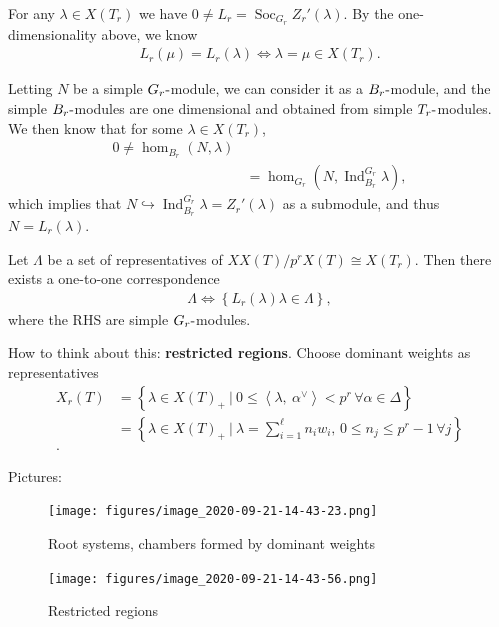 For any \(\lambda \in X(T_r)\) we have
\(0\neq L_r = \operatorname{Soc}_{G_r} Z_r'(\lambda)\). By the
one-dimensionality above, we know
\begin{align*}  
L_r(\mu) = L_r(\lambda) \iff \lambda = \mu \in X(T_r)
.\end{align*}

Letting \(N\) be a simple \(G_r{\hbox{-}}\)module, we can consider it as
a \(B_r{\hbox{-}}\)module, and the simple \(B_r{\hbox{-}}\)modules are
one dimensional and obtained from simple \(T_r{\hbox{-}}\)modules. We
then know that for some \(\lambda \in X(T_r)\),
\begin{align*}  
0 \neq \hom_{B_r}(N, \lambda) \\
&= \hom_{G_r}(N, \operatorname{Ind}_{B_r}^{G_r} \lambda)
,\end{align*}
which implies that
\(N\hookrightarrow\operatorname{Ind}_{B_r}^{G_r} \lambda = Z_r'(\lambda)\)
as a submodule, and thus \(N = L_r(\lambda)\).

\begin{theorem}

Let \(\Lambda\) be a set of representatives of
\(XX(T) / p^r X(T) \cong X(T_r)\). Then there exists a one-to-one
correspondence
\begin{align*}  
\Lambda \iff \left\{{L_r(\lambda) \lambda \in \Lambda}\right\}
,\end{align*}
where the RHS are simple \(G_r{\hbox{-}}\)modules.

\end{theorem}

How to think about this: \textbf{restricted regions}. Choose dominant
weights as representatives
\begin{align*}  
X_r(T) 
&= \left\{{\lambda \in X(T)_+ {~\mathrel{\Big|}~}0\leq {\left\langle {\lambda},~{\alpha^\vee} \right\rangle} < p^r\, \forall \alpha\in \Delta }\right\} \\
&= \left\{{\lambda \in X(T)_+ {~\mathrel{\Big|}~}\lambda = \sum_{i=1}^\ell n_i w_i,\, 0\leq n_j \leq p^r-1\, \forall j}\right\} \\
.\end{align*}

Pictures:

\begin{figure}
\centering
\texttt{[image: figures/image\_2020-09-21-14-43-23.png]}
\caption{Root systems, chambers formed by dominant weights}
\end{figure}

\begin{figure}
\centering
\texttt{[image: figures/image\_2020-09-21-14-43-56.png]}
\caption{Restricted regions}
\end{figure}

